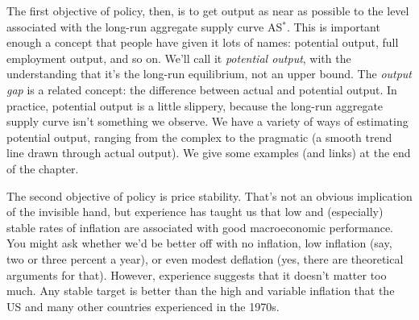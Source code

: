 The first objective of policy, then,
is to get output as near as possible to
the level associated with the long-run
aggregate supply curve AS$^*$.
This is important enough a concept that people have given it
lots of names:  potential output, full employment output, and so on.
We'll call it {\it potential output\/}, with the understanding that it's
the long-run equilibrium, not an upper bound.
The {\it output gap\/} is a related concept:
the difference between actual and potential output.
In practice, potential output is a little slippery,
because the long-run aggregate supply curve
isn't something we observe.
We have a variety of ways of estimating potential output,
ranging from the complex  to
the pragmatic (a smooth trend line drawn through actual output).
We give some examples (and links) at the end of the chapter.

The second objective of policy is price stability.
That's not an obvious implication of the invisible hand,
but experience has taught us that low and (especially) stable rates of
inflation are associated with good macroeconomic performance.
You might ask whether we'd be better off with no inflation,
low inflation (say, two or three percent a year),
or even modest deflation (yes, there are theoretical arguments
for that).
However, experience suggests that it doesn't matter too much. Any stable target is better than
the high and variable inflation that the US and many other countries
experienced in the 1970s.


